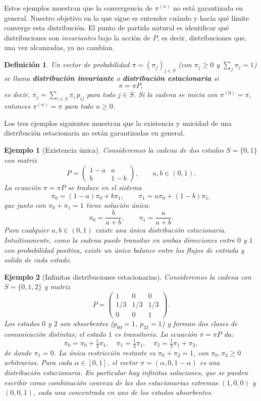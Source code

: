 \documentclass[12pt]{book}
\newtheorem{definition}{Definición}[chapter]
\newtheorem{example}{Ejemplo}[chapter]
\begin{document}
Estos ejemplos muestran que la convergencia de $\pi^{(n)}$ no está garantizada en general. Nuestro objetivo en lo que sigue es entender cuándo y hacia qué límite converge esta distribución. El punto de partida natural es identificar qué distribuciones son \emph{invariantes} bajo la acción de $P$, es decir, distribuciones que, una vez alcanzadas, ya no cambian.

\begin{definition}
    Un vector de probabilidad $\pi = (\pi_j)_{j\in S}$ (con $\pi_j \ge 0$ y $\sum_j \pi_j = 1$) se llama \textbf{distribución invariante} o \textbf{distribución estacionaria} si
    \[
        \pi = \pi P,
    \]
    es decir, $\pi_j = \sum_{i\in S} \pi_i\, p_{ij}$ para todo $j \in S$. Si la cadena se inicia con $\pi^{(0)} = \pi$, entonces $\pi^{(n)} = \pi$ para todo $n \ge 0$.
\end{definition}

Los tres ejemplos siguientes muestran que la existencia y unicidad de una distribución estacionaria no están garantizadas en general.

\begin{example}[Existencia única]
    Consideremos la cadena de dos estados $S = \{0, 1\}$ con matriz
    \[
        P = \begin{pmatrix} 1-a & a \\ b & 1-b \end{pmatrix}, \qquad a, b \in (0,1).
    \]
    La ecuación $\pi = \pi P$ se traduce en el sistema
    \[
        \pi_0 = (1-a)\pi_0 + b\pi_1, \qquad \pi_1 = a\pi_0 + (1-b)\pi_1,
    \]
    que junto con $\pi_0 + \pi_1 = 1$ tiene solución única:
    \[
        \pi_0 = \frac{b}{a+b}, \qquad \pi_1 = \frac{a}{a+b}.
    \]
    Para cualquier $a, b \in (0,1)$ existe una única distribución estacionaria. Intuitivamente, como la cadena puede transitar en ambas direcciones entre $0$ y $1$ con probabilidad positiva, existe un único balance entre los flujos de entrada y salida de cada estado.
\end{example}

\begin{example}[Infinitas distribuciones estacionarias]
    Consideremos la cadena con $S = \{0, 1, 2\}$ y matriz
    \[
        P = \begin{pmatrix} 1 & 0 & 0 \\ 1/3 & 1/3 & 1/3 \\ 0 & 0 & 1 \end{pmatrix}.
    \]
    Los estados $0$ y $2$ son absorbentes ($p_{00}=1$, $p_{22}=1$) y forman dos clases de comunicación distintas; el estado $1$ es transitorio. La ecuación $\pi = \pi P$ da:
    \[
        \pi_0 = \pi_0 + \tfrac{1}{3}\pi_1, \quad
        \pi_1 = \tfrac{1}{3}\pi_1, \quad
        \pi_2 = \tfrac{1}{3}\pi_1 + \pi_2,
    \]
    de donde $\pi_1 = 0$. La única restricción restante es $\pi_0 + \pi_2 = 1$, con $\pi_0, \pi_2 \ge 0$ arbitrarios. Para cada $\alpha \in [0,1]$, el vector $\pi = (\alpha, 0, 1-\alpha)$ es una distribución estacionaria. En particular hay infinitas soluciones, que se pueden escribir como combinación convexa de las dos estacionarias extremas $(1,0,0)$ y $(0,0,1)$, cada una concentrada en uno de los estados absorbentes.
\end{example}
\end{document}
